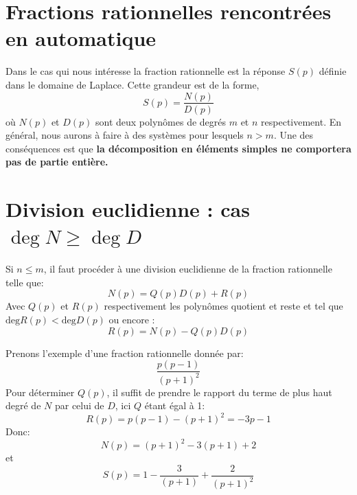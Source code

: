 \section{Fractions rationnelles rencontrées en automatique}
Dans le cas qui nous intéresse la fraction rationnelle est la 
réponse $S(p)$ définie dans le domaine de Laplace.
Cette grandeur est de la forme,
\[
S(p)=\dfrac{N(p)}{D(p)}
\]
où $N(p)$ et $D(p)$ sont deux polynômes de degrés $m$ et $n$ respectivement.
En général, nous aurons à faire à des systèmes pour lesquels $n>m$. 
Une des conséquences est que \textbf{la décomposition en éléments 
simples ne comportera pas de partie entière.}

\section{Division euclidienne : cas $\deg N\ge\deg D$}
Si $n\le m$, il faut procéder à une division euclidienne de la 
fraction rationnelle telle que:
\[
  N(p) = Q(p)D(p) + R(p) 
\]
Avec $Q(p)$ et $R(p)$ respectivement les polynômes quotient et reste et tel que
$\text{deg}R(p)<\text{deg}D(p)$ ou encore :
\[
    R(p) = N(p) - Q(p)D(p)
\]

Prenons l'exemple d'une fraction rationnelle donnée par:
\[
    \dfrac{p(p-1)}{(p+1)^2}
\]
Pour déterminer $Q(p)$, il suffit de prendre le rapport du terme de plus haut degré 
de $N$ par celui de $D$, ici $Q$ étant égal à 1:
\[
    R(p)=p(p-1)-(p+1)^2=-3p-1
\]
Donc:
\[
    N(p)=(p+1)^2-3(p+1)+2
\]
et 
\[
    S(p)=1-\dfrac{3}{(p+1)}+\dfrac{2}{(p+1)^2}
\]

